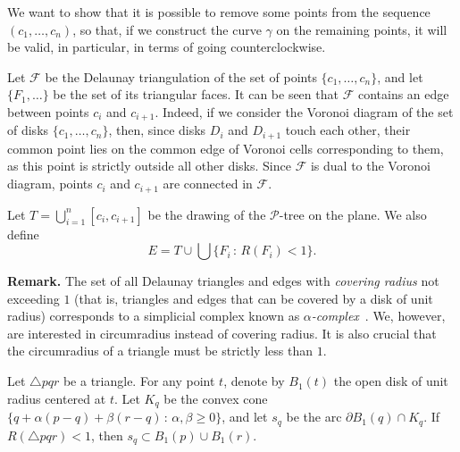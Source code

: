 \begin{appendices}
We want to show that it is possible to remove some points from the sequence $(c_1, \ldots, c_n)$, so that, if we construct the curve $\gamma$ on the remaining points, it will be valid, in particular, in terms of going counterclockwise.

Let $\mathcal{F}$ be the Delaunay triangulation of the set of points $\{c_1, \ldots, c_n\}$, and let $\{F_1, \ldots\}$ be the set of its triangular faces.
It can be seen that $\mathcal{F}$ contains an edge between points $c_i$ and $c_{i+1}$. Indeed, if we consider the Voronoi diagram of the set of disks $\{c_1, \ldots, c_n\}$, then, since disks $D_i$ and $D_{i+1}$ touch each other, their common point lies on the common edge of Voronoi cells corresponding to them, as this point is strictly outside all other disks. Since $\mathcal{F}$ is dual to the Voronoi diagram, points $c_i$ and $c_{i+1}$ are connected in $\mathcal{F}$.

Let $T = \bigcup_{i=1}^n[c_i, c_{i+1}]$ be the drawing of the $\mathcal{P}$-tree on the plane. We also define $$E = T\cup\bigcup\{F_i\,\colon\, R(F_i) < 1\}.$$

\textbf{Remark.} The set of all Delaunay triangles and edges with \emph{covering radius} not exceeding $1$ (that is, triangles and edges that can be covered by a disk of unit radius) corresponds to a simplicial complex known as \emph{$\alpha$-complex}~\cite{alpha_shapes}. We, however, are interested in circumradius instead of covering radius. It is also crucial that the circumradius of a triangle must be strictly less than $1$.

\begin{lemma}\label{lemma:small-R-is-good}
Let $\triangle pqr$ be a triangle. For any point $t$, denote by $B_1(t)$ the open disk of unit radius centered at $t$. Let $K_q$ be the convex cone $\{q + \alpha(p - q) + \beta(r - q)\,\colon\,\alpha, \beta\geq 0\}$, and let $s_q$ be the arc $\partial B_1(q)\cap K_q$. If $R(\triangle pqr) < 1$, then $s_q\subset B_1(p)\cup B_1(r)$.
\end{lemma}


\end{appendices}
